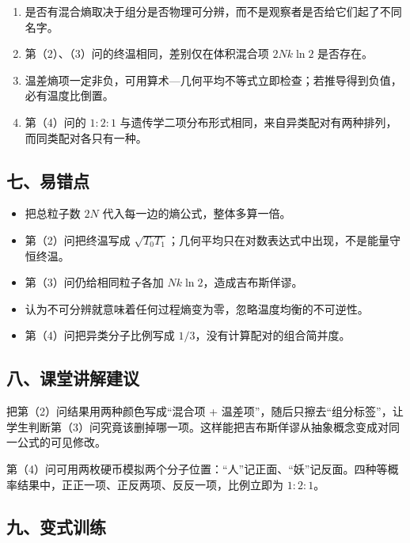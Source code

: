 \documentclass[12pt,a4paper,UTF8]{ctexart}
\newcommand{\tightlist}{\setlength{\itemsep}{0pt}\setlength{\parskip}{0pt}}
\begin{document}
\begin{enumerate}
\def\labelenumi{\arabic{enumi}.}
\tightlist
\item
  是否有混合熵取决于组分是否物理可分辨，而不是观察者是否给它们起了不同名字。
\item
  第（2）、（3）问的终温相同，差别仅在体积混合项 \(2Nk\ln2\) 是否存在。
\item
  温差熵项一定非负，可用算术---几何平均不等式立即检查；若推导得到负值，必有温度比倒置。
\item
  第（4）问的 \(1:2:1\)
  与遗传学二项分布形式相同，来自异类配对有两种排列，而同类配对各只有一种。
\end{enumerate}

\subsection{七、易错点}\label{ux4e03ux6613ux9519ux70b9-5}

\begin{itemize}
\tightlist
\item
  把总粒子数 \(2N\) 代入每一边的熵公式，整体多算一倍。
\item
  第（2）问把终温写成
  \(\sqrt{T_0T_1}\)；几何平均只在对数表达式中出现，不是能量守恒终温。
\item
  第（3）问仍给相同粒子各加 \(Nk\ln2\)，造成吉布斯佯谬。
\item
  认为不可分辨就意味着任何过程熵变为零，忽略温度均衡的不可逆性。
\item
  第（4）问把异类分子比例写成 \(1/3\)，没有计算配对的组合简并度。
\end{itemize}

\subsection{八、课堂讲解建议}\label{ux516bux8bfeux5802ux8bb2ux89e3ux5efaux8bae-5}

把第（2）问结果用两种颜色写成``混合项 +
温差项''，随后只擦去``组分标签''，让学生判断第（3）问究竟该删掉哪一项。这样能把吉布斯佯谬从抽象概念变成对同一公式的可见修改。

第（4）问可用两枚硬币模拟两个分子位置：``人''记正面、``妖''记反面。四种等概率结果中，正正一项、正反两项、反反一项，比例立即为
\(1:2:1\)。

\subsection{九、变式训练}\label{ux4e5dux53d8ux5f0fux8badux7ec3-5}
\end{document}
